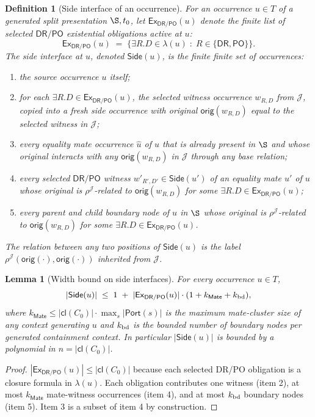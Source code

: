 \documentclass[11pt]{article}
\newtheorem{lemma}[theorem]{Lemma}
\newtheorem{definition}[theorem]{Definition}
\newcommand{\DR}{\mathsf{DR}}
\newcommand{\PO}{\mathsf{PO}}
\newcommand{\Cl}{\mathsf{cl}}
\newcommand{\Ex}{\mathsf{Ex}}
\newcommand{\J}{\mathcal J}
\newcommand{\orig}{\mathsf{orig}}
\newcommand{\Port}{\mathsf{Port}}
\newcommand{\Mate}{\mathsf{Mate}}
\newcommand{\Side}{\mathsf{Side}}
\begin{document}
\begin{definition}[Side interface of an occurrence]\label{def:side-interface}
For an occurrence $u\in T$ of a generated split presentation
$\S,t_0$, let $\Ex_{\DR/\PO}(u)$ denote the finite list of
selected $\DR/\PO$ existential obligations active at $u$:
\[
  \Ex_{\DR/\PO}(u)\;=\;\{\exists R.D\in\lambda(u)\;:\;R\in\{\DR,\PO\}\}.
\]
The \emph{side interface at $u$}, denoted $\Side(u)$, is the
finite finite set of occurrences:
\begin{enumerate}[label=(\arabic*)]
\item the source occurrence $u$ itself;
\item for each $\exists R.D\in\Ex_{\DR/\PO}(u)$, the selected
witness occurrence $w_{R,D}$ from $\J$, copied into a fresh side
occurrence with original $\orig(w_{R,D})$ equal to the selected
witness in $\J$;
\item every equality mate occurrence $\widehat u$ of $u$ that is
already present in $\S$ and whose original interacts with any
$\orig(w_{R,D})$ in $\J$ through any base relation;
\item every selected $\DR/\PO$ witness $w'_{R',D'}\in\Side(u')$ of
an equality mate $u'$ of $u$ whose original is $\rho^\J$-related to
$\orig(w_{R,D})$ for some $\exists R.D\in\Ex_{\DR/\PO}(u)$;
\item every parent and child boundary node of $u$ in $\S$ whose
original is $\rho^\J$-related to $\orig(w_{R,D})$ for some
$\exists R.D\in\Ex_{\DR/\PO}(u)$.
\end{enumerate}
The relation between any two positions of $\Side(u)$ is the label
$\rho^\J(\orig(\cdot),\orig(\cdot))$ inherited from $\J$.
\end{definition}

\begin{lemma}[Width bound on side interfaces]\label{lem:side-width}
For every occurrence $u\in T$,
\[
  |\Side(u)|\;\le\;1\;+\;|\Ex_{\DR/\PO}(u)|\cdot(1+k_{\Mate}+k_{\rm bd}),
\]
where $k_{\Mate}\le|\Cl(C_0)|\cdot\max_s|\Port(s)|$ is the maximum
mate-cluster size of any context generating $u$ and $k_{\rm bd}$ is
the bounded number of boundary nodes per generated containment
context.  In particular $|\Side(u)|$ is bounded by a polynomial in
$n=|\Cl(C_0)|$.
\end{lemma}

\begin{proof}
$|\Ex_{\DR/\PO}(u)|\le|\Cl(C_0)|$ because each selected DR/PO
obligation is a closure formula in $\lambda(u)$.  Each obligation
contributes one witness (item 2), at most $k_{\Mate}$ mate-witness
occurrences (item 4), and at most $k_{\rm bd}$ boundary nodes
(item 5).  Item 3 is a subset of item 4 by construction.
\end{proof}
\end{document}
